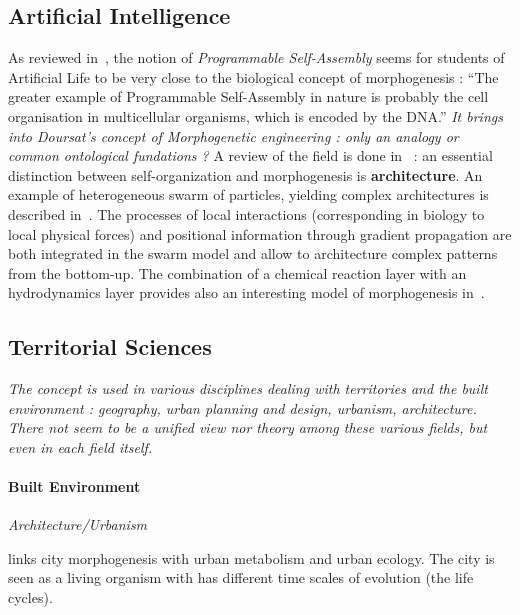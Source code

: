 \documentclass[fleqn,10pt]{wlscirep}
\begin{document}
\subsection*{Artificial Intelligence}


As reviewed in~\cite{crosato2014self}, the notion of \emph{Programmable Self-Assembly} seems for students of Artificial Life to be very close to the biological concept of morphogenesis : ``The greater example of Programmable Self-Assembly in nature is probably the cell organisation in multicellular organisms, which is encoded by the DNA.'' \textit{It brings into Doursat's concept of Morphogenetic engineering : only an analogy or common ontological fundations ?} A review of the field is done in~\cite{doursat2013review} : an essential distinction between self-organization and morphogenesis is \textbf{architecture}. An example of heterogeneous swarm of particles, yielding complex architectures is described in~\cite{doursat2008programmable}. The processes of local interactions (corresponding in biology to local physical forces) and positional information through gradient propagation are both integrated in the swarm model and allow to architecture complex patterns from the bottom-up. The combination of a chemical reaction layer with an hydrodynamics layer provides also an interesting model of morphogenesis in~\cite{cussat2012synthesis}.




\subsection*{Territorial Sciences}

\textit{The concept is used in various disciplines dealing with territories and the built environment : geography, urban planning and design, urbanism, architecture. There not seem to be a unified view nor theory among these various fields, but even in each field itself.}

\paragraph{Built Environment}

\textit{Architecture/Urbanism}

\cite{olsen1982urban} links city morphogenesis with urban metabolism and urban ecology. The city is seen as a living organism with has different time scales of evolution (the life cycles).
\end{document}
